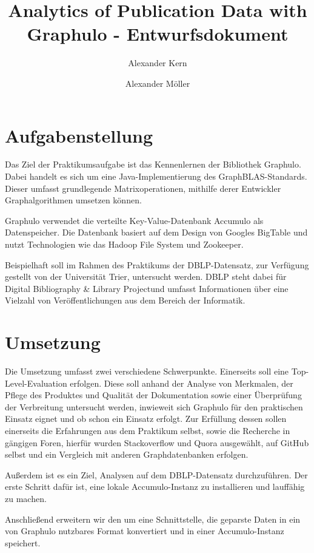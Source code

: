 \documentclass{article}
\title{Analytics of Publication Data with Graphulo - Entwurfsdokument}
\author{Alexander Kern \and Alexander Möller}
\begin{document}
\maketitle
	
\section{Aufgabenstellung}

Das Ziel der Praktikumsaufgabe ist das Kennenlernen der Bibliothek Graphulo. Dabei handelt es sich um eine Java-Implementierung des GraphBLAS-Standards. Dieser umfasst grundlegende Matrixoperationen, mithilfe derer Entwickler Graphalgorithmen umsetzen können. \cite{graph}

Graphulo verwendet die verteilte Key-Value-Datenbank Accumulo als Datenspeicher. Die Datenbank basiert auf dem Design von Googles BigTable und nutzt Technologien wie das Hadoop File System und Zookeeper. \cite{acc} 

Beispielhaft soll im Rahmen des Praktikums der DBLP-Datensatz, zur Verfügung gestellt von der Universität Trier, untersucht werden. DBLP steht dabei für \glqq Digital Bibliography \& Library Project\grqq und umfasst Informationen über eine Vielzahl von Veröffentlichungen aus dem Bereich der Informatik. \cite{dblp}


\section{Umsetzung}

Die Umsetzung umfasst zwei verschiedene Schwerpunkte. 
Einerseits soll eine Top-Level-Evaluation erfolgen. Diese soll anhand der Analyse von Merkmalen, der Pflege des Produktes und Qualität der Dokumentation sowie einer Überprüfung der Verbreitung untersucht werden, inwieweit sich Graphulo für den praktischen Einsatz eignet und ob schon ein Einsatz erfolgt.  Zur Erfüllung dessen sollen einerseits die Erfahrungen aus dem Praktikum selbst, sowie die Recherche in gängigen Foren, hierfür wurden Stackoverflow und Quora ausgewählt, auf GitHub selbst und ein Vergleich mit anderen Graphdatenbanken erfolgen.

Außerdem ist es ein Ziel, Analysen auf dem DBLP-Datensatz durchzuführen. Der erste Schritt dafür ist, eine lokale Accumulo-Instanz zu installieren und lauffähig zu machen.

Anschließend erweitern wir den \cite{pars} um eine Schnittstelle, die geparste Daten in ein von Graphulo nutzbares Format konvertiert und in einer Accumulo-Instanz speichert.
\end{document}

